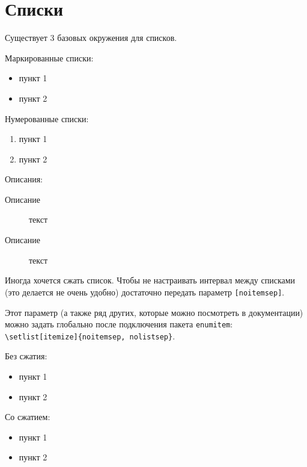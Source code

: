 
\section{Списки}

Существует 3 базовых окружения для списков.

Маркированные списки:
\begin{itemize}
    \item пункт 1
    \item пункт 2
\end{itemize}

Нумерованные списки:
\begin{enumerate}
    \item пункт 1
    \item пункт 2
\end{enumerate}

Описания:
\begin{description}
    \item[Описание] текст
    \item[Описание] текст
\end{description}

Иногда хочется сжать список. Чтобы не настраивать интервал между списками (это делается не очень удобно) достаточно передать параметр \texttt{[noitemsep]}. 

Этот параметр (а также ряд других, которые можно посмотреть в документации) можно задать глобально после подключения пакета \texttt{enumitem}: \verb+\setlist[itemize]{noitemsep, nolistsep}+.


Без сжатия:
\begin{itemize}
    \item пункт 1
    \item пункт 2
\end{itemize}

Со сжатием:
\begin{itemize}[noitemsep]
    \item пункт 1
    \item пункт 2
\end{itemize}
